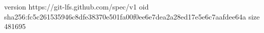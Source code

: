 version https://git-lfs.github.com/spec/v1
oid sha256:fc5c261535946c8dfe38370e501fa00f0ee6e7dea2a28ed17e5e6c7aafdee64a
size 481695
